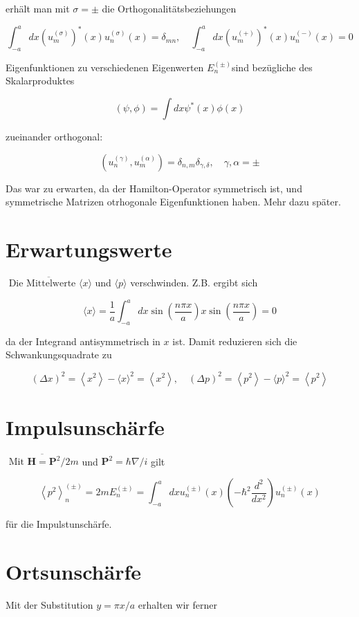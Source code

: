 \documentclass[10pt, letterpaper]{article}
\begin{document}
erhält man mit $\sigma= \pm$ die Orthogonalitätsbeziehungen

$$
\int_{-a}^{a} d x\left(u_{m}^{(\sigma)}\right)^{*}(x) u_{n}^{(\sigma)}(x)=\delta_{m n}, \quad \int_{-a}^{a} d x\left(u_{m}^{(+)}\right)^{*}(x) u_{n}^{(-)}(x)=0
$$

Eigenfunktionen zu verschiedenen Eigenwerten $E_{n}^{( \pm)}$sind bezügliche des Skalarproduktes

$$
(\psi, \phi)=\int d x \psi^{*}(x) \phi(x)
$$

zueinander orthogonal:

$$
\left(u_{n}^{(\gamma)}, u_{m}^{(\alpha)}\right)=\delta_{n, m} \delta_{\gamma, \delta}, \quad \gamma, \alpha= \pm
$$

Das war zu erwarten, da der Hamilton-Operator symmetrisch ist, und symmetrische Matrizen otrhogonale Eigenfunktionen haben. Mehr dazu später.

\section*{Erwartungswerte}
$\overline{\text { Die Mittelwerte }\langle x\rangle}$ und $\langle p\rangle$ verschwinden. Z.B. ergibt sich

$$
\langle x\rangle=\frac{1}{a} \int_{-a}^{a} d x \sin \left(\frac{n \pi x}{a}\right) x \sin \left(\frac{n \pi x}{a}\right)=0
$$

da der Integrand antisymmetrisch in $x$ ist. Damit reduzieren sich die Schwankungsquadrate zu

$$
(\Delta x)^{2}=\left\langle x^{2}\right\rangle-\langle x\rangle^{2}=\left\langle x^{2}\right\rangle, \quad(\Delta p)^{2}=\left\langle p^{2}\right\rangle-\langle p\rangle^{2}=\left\langle p^{2}\right\rangle
$$

\section*{Impulsunschärfe}
$\overline{\text { Mit } \mathbf{H}=\mathbf{P}^{2} / 2 m}$ und $\mathbf{P}^{2}=\hbar \nabla / i$ gilt

$$
\left\langle p^{2}\right\rangle_{n}^{( \pm)}=2 m E_{n}^{( \pm)}=\int_{-a}^{a} d x u_{n}^{( \pm)}(x)\left(-\hbar^{2} \frac{d^{2}}{d x^{2}}\right) u_{n}^{( \pm)}(x)
$$

für die Impulstunschärfe.

\section*{Ortsunschärfe}
Mit der Substitution $y=\pi x / a$ erhalten wir ferner
\end{document}
